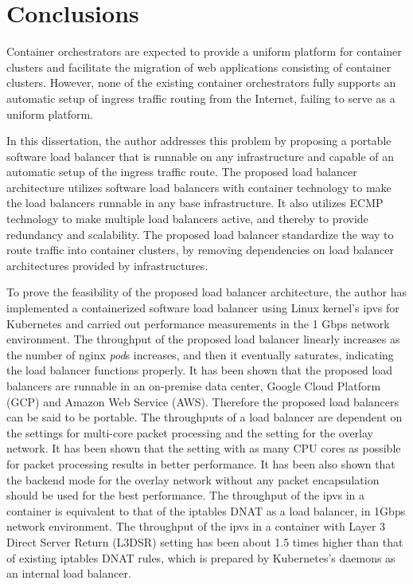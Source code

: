 \section{Conclusions}\label{Conclusions}

Container orchestrators are expected to provide a uniform platform for container clusters and facilitate the migration of web applications consisting of container clusters.
However, none of the existing container orchestrators fully supports an automatic setup of ingress traffic routing from the Internet, failing to serve as a uniform platform.

In this dissertation, the author addresses this problem by proposing a portable software load balancer that is runnable on any infrastructure and capable of an automatic setup of the ingress traffic route.
The proposed load balancer architecture utilizes software load balancers with container technology to make the load balancers runnable in any base infrastructure.
It also utilizes ECMP technology to make multiple load balancers active, and thereby to provide redundancy and scalability.
The proposed load balancer standardize the way to route traffic into container clusters, by removing dependencies on load balancer architectures provided by infrastructures.

To prove the feasibility of the proposed load balancer architecture, the author has implemented a containerized software load balancer using Linux kernel's ipvs for Kubernetes and carried out performance measurements in the 1 Gbps network environment.
%
The throughput of the proposed load balancer linearly increases as the number of nginx {\em pod}s increases, and then it eventually saturates, indicating the load balancer functions properly.
It has been shown that the proposed load balancers are runnable in an on-premise data center, Google Cloud Platform (GCP) and Amazon Web Service (AWS).
Therefore the proposed load balancers can be said to be portable.
%
The throughputs of a load balancer are dependent on the settings for multi-core packet processing and the setting for the overlay network.
It has been shown that the setting with as many CPU cores as possible for packet processing results in better performance.
It has been also shown that the backend mode for the overlay network without any packet encapsulation should be used for the best performance.
%
The throughput of the ipvs in a container is equivalent to that of the iptables DNAT as a load balancer, in 1Gbps network environment.
The throughput of the ipvs in a container with Layer 3 Direct Server Return (L3DSR) setting has been about 1.5 times higher than that of existing iptables DNAT rules, which is prepared by Kubernetes's daemons as an internal load balancer.

